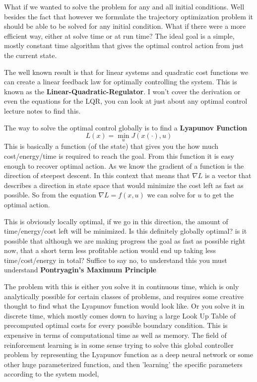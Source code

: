 \documentclass[a4paper, 10pt, twocolumn]{article}
\begin{document}
What if we wanted to solve the problem for any and all initial conditions. Well besides the fact that however we formulate the trajectory optimization problem it should be able to be solved for any initial condition.
What if there were a more efficient way, either at solve time or at run time? The ideal goal is a simple, mostly constant time algorithm that gives the optimal control action from just the current state.

The well known result is that for linear systems and quadratic cost functions we can create a linear feedback law for optimally controlling the system. This is known as the \textbf{Linear-Quadratic-Regulator}. I won't cover the derivation or even the equations for the LQR, you can look at just about any optimal control lecture notes to find this.

The way to solve the optimal control globally is to find a \textbf{Lyapunov Function}
\begin{equation}
    L(x) = \min_{u} J(x(\cdot), u)
\end{equation}
This is basically a function (of the state) that gives you the how much cost/energy/time is required to reach the goal.
From this function it is easy enough to recover optimal action.
As we know the gradient of a function is the direction of steepest descent.
In this context that means that \(\nabla L\) is a vector that describes a direction in state space that would minimize the cost left as fast as possible. So from the equation \( \nabla L = f(x, u) \) we can solve for \(u\) to get the optimal action.

This is obviously locally optimal, if we go in this direction, the amount of time/energy/cost left will be minimized. Is this definitely globally optimal? is it possible that although we are making progress the goal as fast as possible right now, that a short term less profitable action would end up taking less time/cost/energy in total? Suffice to say no, to understand this you must understand \textbf{Pontryagin's Maximum Principle}

The problem with this is either you solve it in continuous time, which is only analytically possible for certain classes of problems, and requires some creative thought to find what the Lyapunov function would look like. Or you solve it in discrete time, which mostly comes down to having a large Look Up Table of precomputed optimal costs for every possible boundary condition. This is expensive in terms of computational time as well as memory. The field of reinforcement learning is in some sense trying to solve this global controller problem by representing the Lyapunov function as a deep neural network or some other huge parameterized function, and then 'learning' the specific parameters according to the system model,
\end{document}
